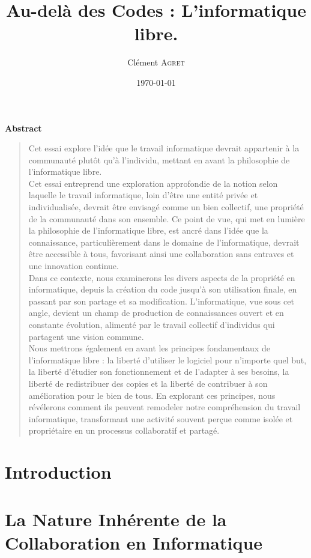 \documentclass[10pt]{book}
\title{Au-delà des Codes  : L'informatique libre.}
\author{Clément \textsc{Agret}}
\date{\today}
\begin{document}
\maketitle
\begin{center}
\large \textbf{Abstract}
\end{center}

\begin{quotation}
Cet essai explore l'idée que le travail informatique devrait appartenir à la communauté plutôt qu'à l'individu, mettant en avant la philosophie de l'informatique libre.\\
Cet essai entreprend une exploration approfondie de la notion selon laquelle le travail informatique, loin d'être une entité privée et individualisée, devrait être envisagé comme un bien collectif, une propriété de la communauté dans son ensemble. Ce point de vue, qui met en lumière la philosophie de l'informatique libre, est ancré dans l'idée que la connaissance, particulièrement dans le domaine de l'informatique, devrait être accessible à tous, favorisant ainsi une collaboration sans entraves et une innovation continue.\\

Dans ce contexte, nous examinerons les divers aspects de la propriété en informatique, depuis la création du code jusqu'à son utilisation finale, en passant par son partage et sa modification. L'informatique, vue sous cet angle, devient un champ de production de connaissances ouvert et en constante évolution, alimenté par le travail collectif d'individus qui partagent une vision commune.\\

Nous mettrons également en avant les principes fondamentaux de l'informatique libre : la liberté d'utiliser le logiciel pour n'importe quel but, la liberté d'étudier son fonctionnement et de l'adapter à ses besoins, la liberté de redistribuer des copies et la liberté de contribuer à son amélioration pour le bien de tous. En explorant ces principes, nous révélerons comment ils peuvent remodeler notre compréhension du travail informatique, transformant une activité souvent perçue comme isolée et propriétaire en un processus collaboratif et partagé.
\end{quotation}

\newpage
\chapter*{Introduction}

\chapter{La Nature Inhérente de la Collaboration en Informatique}

\end{document}
